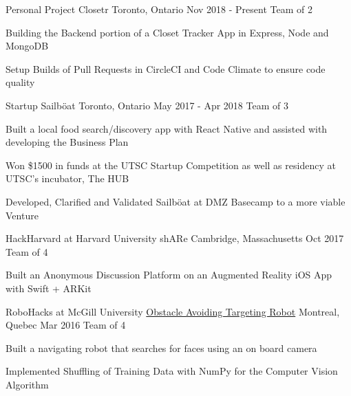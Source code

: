 \begin{cventries}
\cventry
    {Personal Project}
    {Closetr}
    {Toronto, Ontario}
    {Nov 2018 - Present}
    {Team of 2}
    {
      \begin{cvitems}
        \item{Building the Backend portion of a Closet Tracker App in Express, Node and MongoDB}
        \item{Setup Builds of Pull Requests in CircleCI and Code Climate to ensure code quality}
      \end{cvitems}
    }
\cventry
  {Startup}
  {Sailböat}
  {Toronto, Ontario}
  {May 2017 - Apr 2018}
  {Team of 3}
  {
    \begin{cvitems}
      \item {Built a local food search/discovery app with React Native and assisted with developing the Business Plan}
      \item {Won \$1500 in funds at the UTSC Startup Competition as well as residency at UTSC's incubator, The HUB}
      \item {Developed, Clarified and Validated Sailböat at DMZ Basecamp to a more viable Venture}
    \end{cvitems}
  }
\cventry
  {HackHarvard at Harvard University}
  {shARe}
  {Cambridge, Massachusetts}
  {Oct 2017}
  {Team of 4}
  {
    \begin{cvitems}
      \item {Built an Anonymous Discussion Platform on an Augmented Reality iOS App with Swift + ARKit}
    \end{cvitems}
  }
\cventry
  {RoboHacks at McGill University}
  {\href{https://github.com/PhABC/HeadHunterBots}{Obstacle Avoiding Targeting Robot}}
  {Montreal, Quebec}
  {Mar 2016}
  {Team of 4}
  {
    \begin{cvitems}
      \item {Built a navigating robot that searches for faces using an on board camera}
      \item {Implemented Shuffling of Training Data with NumPy for the Computer Vision Algorithm}
    \end{cvitems}
  }
\end{cventries}
